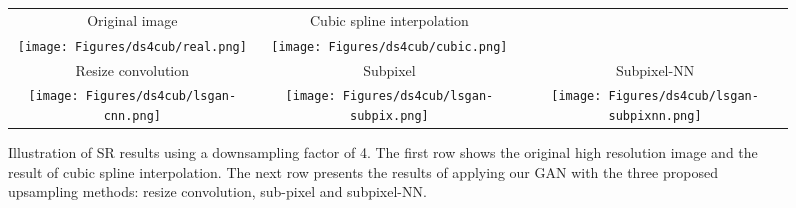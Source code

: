 \documentclass{article}
\begin{document}
\begin{figure*}
\begin{tabular}{ccc}
Original image & Cubic spline interpolation \\
{\texttt{[image: Figures/ds4cub/real.png]}} &
{\texttt{[image: Figures/ds4cub/cubic.png]}} \\
Resize convolution & Subpixel & Subpixel-NN \\
{\texttt{[image: Figures/ds4cub/lsgan-cnn.png]}} &
{\texttt{[image: Figures/ds4cub/lsgan-subpix.png]}} &
{\texttt{[image: Figures/ds4cub/lsgan-subpixnn.png]}} \\
\end{tabular}
\centering
\caption{Illustration of SR results using a downsampling factor of 4. The first row shows the original high resolution image and the result of cubic spline interpolation. The next row presents the results of applying our GAN with the three proposed upsampling methods: resize convolution, sub-pixel and subpixel-NN.}
\label{fig:comparison-visual-1}
\centering
\end{figure*}
\end{document}
